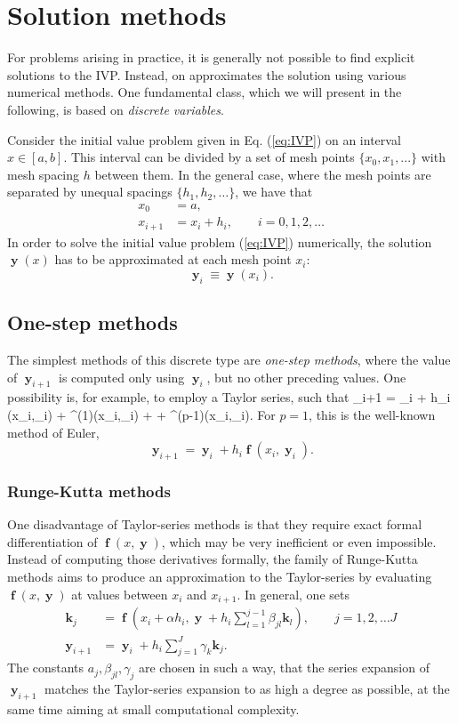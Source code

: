 \section{Solution methods}
For problems arising in practice, it is generally not possible to find explicit solutions to the IVP. Instead, on approximates the solution using various numerical methods.
One fundamental class, which we will present in the following, is based on \textit{discrete variables}.

Consider the initial value problem given in Eq. (\ref{eq:IVP})
on an interval $x\in[a,b]$. This interval can be divided by a set of mesh points $\lbrace x_0,x_1,... \rbrace$ with  mesh spacing $h$ between them. In the general case, where the mesh points are separated by unequal spacings $\lbrace h_1,h_2,\dots\rbrace$, we have that
\begin{align*}
x_0 &= a, \\
x_{i+1} &= x_i + h_i, \qquad i = 0,1,2,\dots
\end{align*}
In order to solve the initial value problem (\ref{eq:IVP}) numerically, the solution $\mbfy(x)$ has to be approximated at each mesh point $x_i$:
\[
\mbfy_i \equiv \mbfy(x_i).
\]

\subsection{One-step methods}

The simplest methods of this discrete type are \textit{one-step methods}, where the value of $\mbfy_{i+1}$  is computed only using $\mbfy_i$,  but no other preceding values. One possibility is, for example, to employ a Taylor series, such that
\be 
\mbfy_{i+1} = \mbfy_i + h_i \mbff(x_i,\mbfy_i) + \mbff^{(1)}(x_i,\mbfy_i) + \cdots + \mbff^{(p-1)}(x_i,\mbfy_i).
\ee 
For $p=1$, this is the well-known method of Euler,
\[
\mbfy_{i+1} = \mbfy_i + h_i \mbff(x_i,\mbfy_i).
\]

\subsubsection{Runge-Kutta methods}
One disadvantage of Taylor-series methods is that they require exact formal differentiation of $\mbff(x,\mbfy)$, which may be very inefficient or even impossible. Instead of computing those derivatives formally, the family of Runge-Kutta methods aims to  produce an approximation to the Taylor-series by evaluating $\mbff(x,\mbfy)$ at values between $x_i$ and $x_{i+1}$. In general, one sets
\begin{align*}
\mathbf{k}_j &= \mbff(x_i + \alpha h_i, \mbfy + h_i \sum_{l=1}^{j-1} \beta_{jl} \mathbf{k}_l), \qquad j = 1,2,\dots J\\
\mbfy_{i+1} &= \mbfy_i + h_i \sum_{j=1}^J \gamma_k \mathbf{k}_j.
\end{align*}
The constants $a_j,\beta_{jl},\gamma_j$ are chosen in such a way, that the series expansion of $\mbfy_{i+1}$ matches the Taylor-series expansion to as high a degree as possible, at the same time aiming at small computational complexity.

